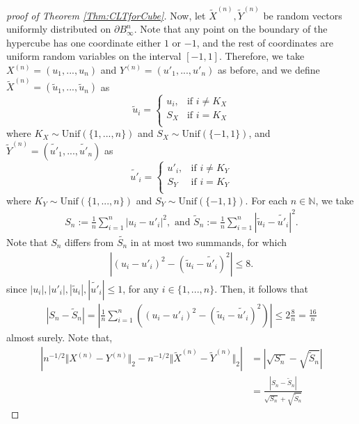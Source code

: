 \documentclass[10pt]{amsart}
\def\N{\mathbb{N}}
\numberwithin{equation}{section}
\begin{document}
\begin{proof}[proof of Theorem \ref{Thm:CLTforCube}]
Now, let $ \tilde{X}^{(n)}, \tilde{Y}^{(n)}$ be random vectors uniformly distributed on $\partial B_\infty ^n$. Note that any point on the boundary of the hypercube has one coordinate either $1$ or $-1$, and the rest of coordinates are uniform random variables on the interval $[-1,1]$. Therefore, we take $X^{(n)} = (u_1, ... , u_n)$ and $Y^{(n)} = (u'_1, ... , u'_n)$ as before, and we define $\tilde{X}^{(n)} = (\tilde{u}_1, ... , \tilde{u}_n)$ as
\[ 
\tilde{u}_i = 
 \begin{cases}
  u_i, & \text{if }i \neq K_X \\
  S_X & \text{if }i=K_X \\
 \end{cases}
\]
where $K_X \sim \text{Unif}(\lbrace 1 , ... , n \rbrace)$ and $S_X \sim \text{Unif}(\lbrace -1 , 1 \rbrace)$, and $\tilde{Y}^{(n)} = (\tilde{u'}_1, ... , \tilde{u'}_n)$ as
\[ 
\tilde{u'}_i = 
 \begin{cases}
  u'_i, & \text{if }i \neq K_Y \\
  S_Y & \text{if }i=K_Y \\
 \end{cases}
\]
where $K_Y \sim \text{Unif}(\lbrace 1 , ... , n \rbrace)$ and $S_Y \sim \text{Unif}(\lbrace -1 , 1 \rbrace)$.
For each $n\in \N$, we take
\begin{align*}
S_n := \frac{1}{n} \sum _{i=1} ^n |u_i - u'_i |^2, \text{ and }  \tilde{S}_n := \frac{1}{n} \sum _{i=1} ^n |\tilde{u}_i - \tilde{u'}_i |^2 .
\end{align*}
Note that $S_n$ differs from $\tilde{S_n}$ in at most two summands, for which
\begin{align*}
\left| (u_i - u'_i )^2 - (\tilde{u}_i - \tilde{u'}_i )^2 \right| \leq 8.
\end{align*}
since $|u_i|, |u'_i|, |\tilde{u}_i|, |\tilde{u'}_i| \leq 1$, for any $i\in \lbrace 1, ... , n\rbrace$. Then, it follows that
\begin{align}
\label{Ineq:SnandSnTilde}
|S_n - \tilde{S}_n | = \left| \frac{1}{n} \sum _{i=1}^n \left( (u_i - u'_i )^2 - (\tilde{u}_i - \tilde{u'}_i )^2  \right) \right| \leq 2 \frac{8}{n} = \frac{16}{n}
\end{align}
almost surely. Note that, 
\begin{align*}
\left| n^{-1/2} \Vert X^{(n)} - Y^{(n)} \Vert _2 - n^{-1/2} \Vert \tilde{X}^{(n)} - \tilde{Y}^{(n)} \Vert _2  \right| & = \left| \sqrt{S_n} - \sqrt{\tilde{S}_n} \right|
 \\
  & = \frac{\left| S_n - \tilde{S}_n \right|}{ \sqrt{S_n} + \sqrt{\tilde{S}_n} }

\end{align*}
\end{proof}
\end{document}
